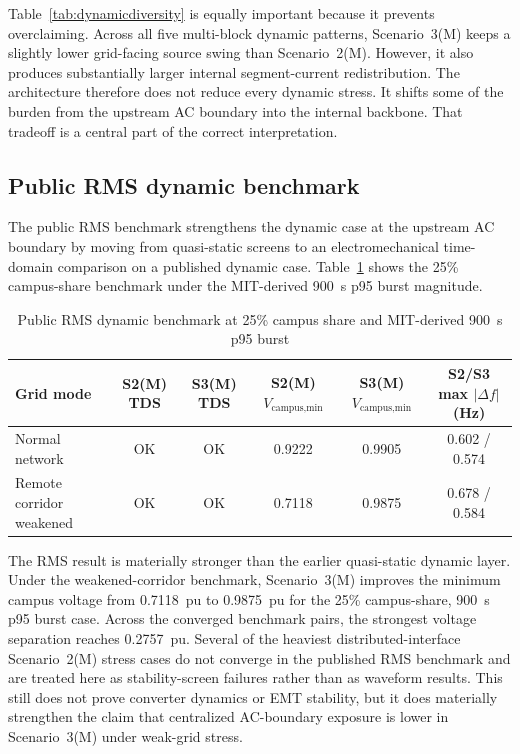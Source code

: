 \documentclass[11pt]{article}
\begin{document}
Table~\ref{tab:dynamicdiversity} is equally important because it prevents overclaiming. Across all five multi-block dynamic patterns, Scenario~3(M) keeps a slightly lower grid-facing source swing than Scenario~2(M). However, it also produces substantially larger internal segment-current redistribution. The architecture therefore does not reduce every dynamic stress. It shifts some of the burden from the upstream AC boundary into the internal backbone. That tradeoff is a central part of the correct interpretation.

\subsection{Public RMS dynamic benchmark}
The public RMS benchmark strengthens the dynamic case at the upstream AC boundary by moving from quasi-static screens to an electromechanical time-domain comparison on a published dynamic case. Table~\ref{tab:rmsdynamic} shows the 25\% campus-share benchmark under the MIT-derived 900~s p95 burst magnitude.

\begin{table}[t]
    \centering
    \caption{Public RMS dynamic benchmark at 25\% campus share and MIT-derived 900~s p95 burst}
    \label{tab:rmsdynamic}
    \begin{tabular}{p{1.55in}ccccc}
        \toprule
        Grid mode & S2(M) TDS & S3(M) TDS & S2(M) $V_{\text{campus,min}}$ & S3(M) $V_{\text{campus,min}}$ & S2/S3 max $|\Delta f|$ (Hz) \\
        \midrule
        Normal network & OK & OK & 0.9222 & 0.9905 & 0.602 / 0.574 \\
        Remote corridor weakened & OK & OK & 0.7118 & 0.9875 & 0.678 / 0.584 \\
        \bottomrule
    \end{tabular}
\end{table}

The RMS result is materially stronger than the earlier quasi-static dynamic layer. Under the weakened-corridor benchmark, Scenario~3(M) improves the minimum campus voltage from 0.7118~pu to 0.9875~pu for the 25\% campus-share, 900~s p95 burst case. Across the converged benchmark pairs, the strongest voltage separation reaches 0.2757~pu. Several of the heaviest distributed-interface Scenario~2(M) stress cases do not converge in the published RMS benchmark and are treated here as stability-screen failures rather than as waveform results. This still does not prove converter dynamics or EMT stability, but it does materially strengthen the claim that centralized AC-boundary exposure is lower in Scenario~3(M) under weak-grid stress.
\end{document}
